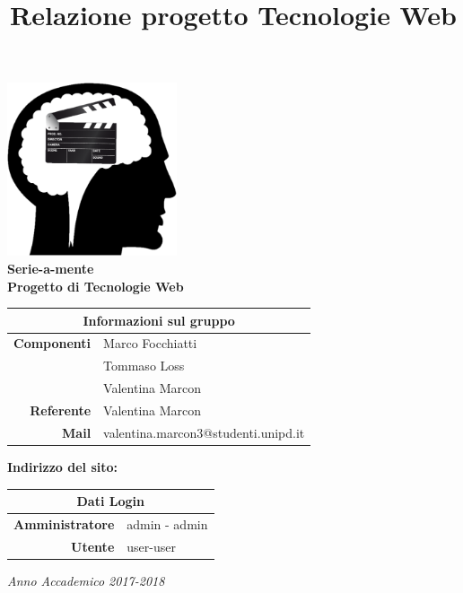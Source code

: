 \documentclass{tecweb}
\title{Relazione progetto Tecnologie Web}
\begin{document}
	\begin{titlepage}
		\begin{center}
			\includegraphics[width=5cm]{Logo2}
			\vspace{0.5cm}	\\
			\Huge \textbf{Serie-a-mente}
			\vspace{0.5cm}\\
			\normalsize \textbf{Progetto di Tecnologie Web}
			\vspace{0.7cm}	\\
			\renewcommand\arraystretch{1.3}	
			\begin{tabularx}{11cm}{r|X}
				\multicolumn{2}{c}{\textbf{Informazioni sul gruppo}}\\ 
				\hline
				\textbf{Componenti} & Marco Focchiatti \\ & Tommaso Loss \\ & Valentina Marcon \\  
				\textbf{Referente} & Valentina Marcon \\ 
				\textbf{Mail} & valentina.marcon3@studenti.unipd.it \\
			\end{tabularx}
			\vspace{0.7cm}
			\textbf{Indirizzo del sito:}
			\vspace{0.7cm}	\\
			\begin{tabularx}{11cm}{r|X}
				\multicolumn{2}{c}{\textbf{Dati Login}}\\ 
				\hline
				\textbf{Amministratore} & admin - admin \\
				\textbf{Utente} & user-user
			\end{tabularx}
		\vspace{2cm}
		\textit{Anno Accademico 2017-2018}
			
		\end{center}
	\end{titlepage}
	\tableofcontents
	\newpage
\end{document}
